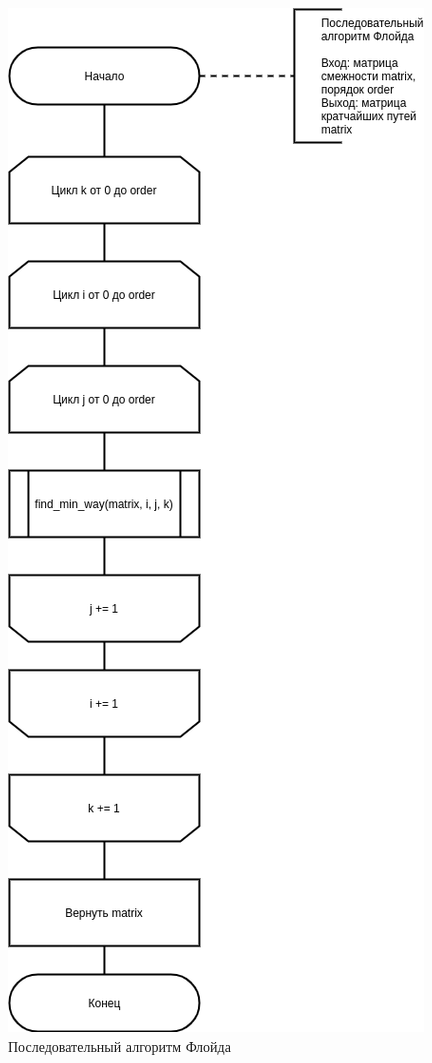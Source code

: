 \begin{figure}[H]
	\begin{center}
		\includegraphics[scale=0.6]{img/floyd.png}
	\end{center}
	\captionsetup{justification=centering}
	\caption{Последовательный алгоритм Флойда}
	\label{img:floyd}
\end{figure}

